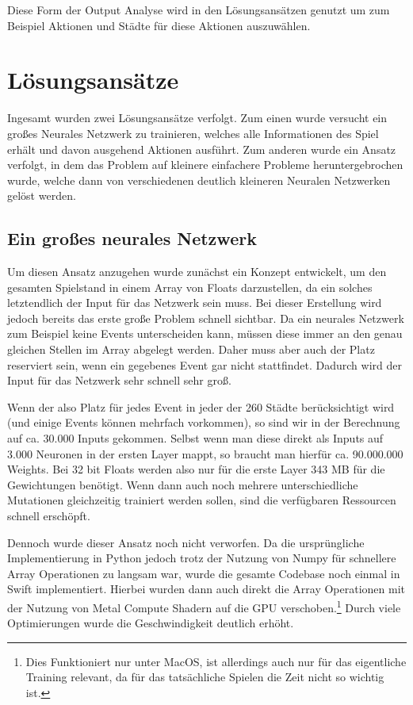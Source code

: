 \documentclass[11pt, twocolumn]{article}
\begin{document}
Diese Form der Output Analyse wird in den Lösungsansätzen genutzt um zum Beispiel Aktionen und Städte für diese Aktionen auszuwählen.


\section{Lösungsansätze}
Ingesamt wurden zwei Lösungsansätze verfolgt. Zum einen wurde versucht ein großes Neurales Netzwerk zu trainieren, welches alle Informationen des Spiel erhält und davon ausgehend Aktionen ausführt. Zum anderen wurde ein Ansatz verfolgt, in dem das Problem auf kleinere einfachere Probleme heruntergebrochen wurde, welche dann von verschiedenen deutlich kleineren Neuralen Netzwerken gelöst werden.

\subsection{Ein großes neurales Netzwerk}
Um diesen Ansatz anzugehen wurde zunächst ein Konzept entwickelt, um den gesamten Spielstand in einem Array von Floats darzustellen, da ein solches letztendlich der Input für das Netzwerk sein muss. Bei dieser Erstellung wird jedoch bereits das erste große Problem schnell sichtbar. Da ein neurales Netzwerk zum Beispiel keine Events unterscheiden kann, müssen diese immer an den genau gleichen Stellen im Array abgelegt werden. Daher muss aber auch der Platz reserviert sein, wenn ein gegebenes Event gar nicht stattfindet. Dadurch wird der Input für das Netzwerk sehr schnell sehr groß.

Wenn der also Platz für jedes Event in jeder der 260 Städte berücksichtigt wird (und einige Events können mehrfach vorkommen), so sind wir in der Berechnung auf ca. 30.000 Inputs gekommen. Selbst wenn man diese direkt als Inputs auf 3.000 Neuronen in der ersten Layer mappt, so braucht man hierfür ca. 90.000.000 Weights. Bei 32 bit Floats werden also nur für die erste Layer 343 MB für die Gewichtungen benötigt. Wenn dann auch noch mehrere unterschiedliche Mutationen gleichzeitig trainiert werden sollen, sind die verfügbaren Ressourcen schnell erschöpft.

Dennoch wurde dieser Ansatz noch nicht verworfen. Da die ursprüngliche Implementierung in Python jedoch trotz der Nutzung von Numpy für schnellere Array Operationen zu langsam war, wurde die gesamte Codebase noch einmal in Swift implementiert. Hierbei wurden dann auch direkt die Array Operationen mit der Nutzung von Metal Compute Shadern auf die GPU verschoben.\footnote{Dies Funktioniert nur unter MacOS, ist allerdings auch nur für das eigentliche Training relevant, da für das tatsächliche Spielen die Zeit nicht so wichtig ist.}  Durch viele Optimierungen wurde die Geschwindigkeit deutlich erhöht. 
\end{document}
